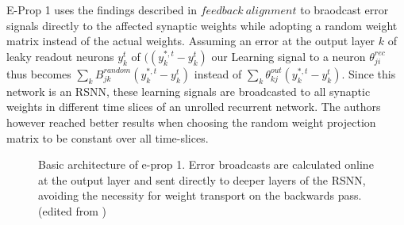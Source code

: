 \documentclass[letterpaper, 10 pt, conference]{ieeeconf}  %
\begin{document}
E-Prop 1 uses the findings described in $feedback\ alignment$ to braodcast error signals directly to the affected synaptic weights 
while adopting a random weight matrix instead of the actual weights. Assuming an error at the output layer $k$ of leaky readout neurons 
$y^t_k$ of $((y^{*,t}_k-y^t_k)$ our Learning signal to a neuron $\theta ^{rec}_{ji}$ thus becomes $\sum_k B^{random}_{jk}(y^{*,t}_k-y^t_k)$
instead of $\sum_k \theta^{out}_{kj}(y^{*,t}_k-y^t_k)$. Since this network is an RSNN, these learning signals are broadcasted to all synaptic
weights in different time slices of an unrolled recurrent network. The authors however reached better results when choosing the random 
weight projection matrix to be constant over all time-slices.

\begin{figure}[thpb]
        \centering
  \caption{Basic architecture of e-prop 1. Error broadcasts are calculated online at the output layer and sent directly
  to deeper layers of the RSNN, avoiding the necessity for weight transport on the backwards pass.(edited 
  from \cite{bellecBiologicallyInspiredAlternatives2019})
  }
        \label{figurelabel}
     \end{figure}
     
\end{document}
